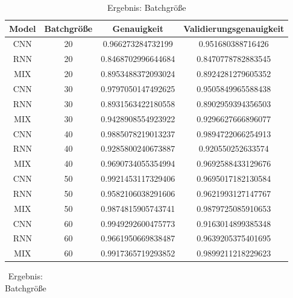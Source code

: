     \begin{table}[H]
        \centering
        \begin{tabular}{|c|c|c|c|}
            \hline
            Model & Batchgröße & Genauigkeit & Validierungsgenauigkeit \\
            \hline
            CNN & 20 & 0.966273284732199 & 0.951680388716426 \\
            \hline
            RNN & 20 & 0.8468702996644684 & 0.8470778782883545 \\ 
            \hline
            MIX & 20 & 0.8953488372093024 & 0.8924281279605352 \\ 
            \hline
            CNN & 30 & 0.9797050147492625 & 0.9505849965588438 \\ 
            \hline
            RNN & 30 & 0.8931563422180558 & 0.8902959394356503 \\ 
            \hline
            MIX & 30 & 0.9428908554923922 & 0.9296627666896077 \\ 
            \hline
            CNN & 40 & 0.9885078219013237 & 0.9894722066254913 \\ 
            \hline
            RNN & 40 & 0.9285800240673887 & 0.920550252633574 \\ 
            \hline
            MIX & 40 & 0.9690734055354994 & 0.9692588433129676 \\ 
            \hline
            CNN & 50 & 0.9921453117329406 & 0.9695017182130584 \\ 
            \hline
            RNN & 50 & 0.9582106038291606 & 0.9621993127147767 \\ 
            \hline
            MIX & 50 & 0.9874815905743741 & 0.9879725085910653 \\ 
            \hline
            CNN & 60 & 0.9949292600475773 & 0.9163014899385348 \\ 
            \hline
            RNN & 60 & 0.9661950669838487 & 0.9639205375401695 \\ 
            \hline
            MIX & 60 & 0.9917365719293852 & 0.9899211218229623 \\ 
            \hline
        \end{tabular}
        \caption{Ergebnis: Batchgröße}
        \label{tabl:ErgebnisBatchsize}
    \end{table}

    \begin{table}[H]
        \centering
        \begin{tabular}{|c|c|c|c|c|c|c|c|c|c|}
        \end{tabular}
        \caption{Ergebnis: Batchgröße}
        \label{tabl:ErgebnisBatchsize}
    \end{table}
        


